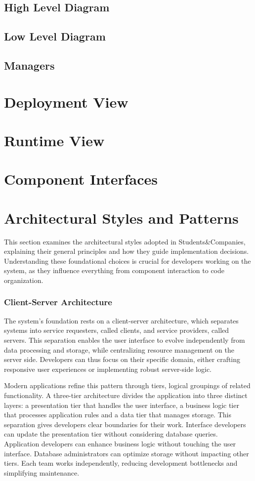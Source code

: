 \subsection{High Level Diagram}
\subsection{Low Level Diagram}
\subsection{Managers}
\section{Deployment View}
\section{Runtime View}
\section{Component Interfaces}
\section{Architectural Styles and Patterns}
This section examines the architectural styles adopted in Students\&Companies, explaining their general principles and how they guide implementation decisions.
Understanding these foundational choices is crucial for developers working on the system, as they influence everything from component interaction to code organization.

\subsubsection{Client-Server Architecture}
The system's foundation rests on a client-server architecture, which separates systems into service requesters, called clients, and service providers, called servers.
This separation enables the user interface to evolve independently from data processing and storage, while centralizing resource management on the server side.
Developers can thus focus on their specific domain, either crafting responsive user experiences or implementing robust server-side logic.

Modern applications refine this pattern through tiers, logical groupings of related functionality.
A three-tier architecture divides the application into three distinct layers: a presentation tier that handles the user interface, a business logic tier that processes application rules and a data tier that manages storage.
This separation gives developers clear boundaries for their work.
Interface developers can update the presentation tier without considering database queries.
Application developers can enhance business logic without touching the user interface.
Database administrators can optimize storage without impacting other tiers.
Each team works independently, reducing development bottlenecks and simplifying maintenance.

